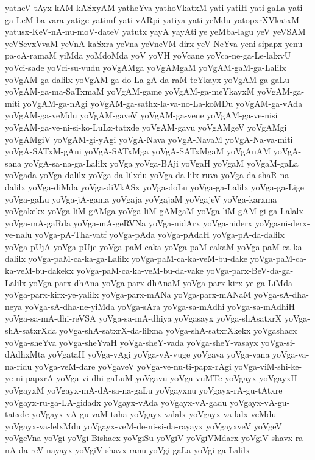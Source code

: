 {yatheV-tAyx-kAM-kASxyAM
yatheYva
yathoVkatxM
yati
yatiH
yati-gaLa
yati-ga-LeM-ba-vara
yatige
yatimf
yati-vARpi
yatiya
yati-yeMdu
yatopxrXVkatxM
yatusx-KeV-nA-nu-moV-dateV
yatutx
yayA
yayAti
ye
yeMba-lagu
yeV
yeVSAM
yeVSevxVvaM
yeVnA-kaSxra
yeVna
yeVneVM-dirx-yeV-NeYva
yeni-sipapx
yenu-pa-cA-ramaM
yiMda
yoMdoMda
yoV
yoVH
yoVcane
yoVca-ne-ga-Le-lalxvU
yoVci-sade
yoVci-su-vudu
yoVgAMga
yoVgAMgaM
yoVgAM-gaM-ga-Lalilx
yoVgAM-ga-dalilx
yoVgAM-ga-do-La-gA-da-raM-teYkayx
yoVgAM-ga-gaLu
yoVgAM-ga-ma-SaTxmaM
yoVgAM-game
yoVgAM-ga-meYkayxM
yoVgAM-ga-miti
yoVgAM-ga-nAgi
yoVgAM-ga-sathx-la-va-no-La-koMDu
yoVgAM-ga-vAda
yoVgAM-ga-veMdu
yoVgAM-gaveV
yoVgAM-ga-vene
yoVgAM-ga-ve-nisi
yoVgAM-ga-ve-ni-si-ko-LuLx-tatxde
yoVgAM-gavu
yoVgAMgeV
yoVgAMgi
yoVgAMgiV
yoVgAM-gi-yAgi
yoVgA-Nava
yoVgA-NavaM
yoVgA-Na-va-miti
yoVgA-SATxM-gAni
yoVgA-SATxMga
yoVgA-SATxMgaM
yoVgAnAM
yoVgA-sana
yoVgA-sa-na-ga-Lalilx
yoVga
yoVga-BAji
yoVgaH
yoVgaM
yoVgaM-gaLa
yoVgada
yoVga-dalilx
yoVga-da-lilxdu
yoVga-da-lilx-ruva
yoVga-da-shaR-na-dalilx
yoVga-diMda
yoVga-diVkASx
yoVga-doLu
yoVga-ga-Lalilx
yoVga-ga-Lige
yoVga-gaLu
yoVga-jA-gama
yoVgaja
yoVgajaM
yoVgajeV
yoVga-karxma
yoVgakekx
yoVga-liM-gAMga
yoVga-liM-gAMgaM
yoVga-liM-gAM-gi-ga-Lalalx
yoVga-mA-gaRda
yoVga-mA-geRVNa
yoVga-nidArx
yoVga-niderx
yoVga-ni-derx-ye-nalu
yoVga-pA-Tha-vatf
yoVga-pAda
yoVga-pAdaH
yoVga-pA-da-dalilx
yoVga-pUjA
yoVga-pUje
yoVga-paM-caka
yoVga-paM-cakaM
yoVga-paM-ca-ka-dalilx
yoVga-paM-ca-ka-ga-Lalilx
yoVga-paM-ca-ka-veM-bu-dake
yoVga-paM-ca-ka-veM-bu-dakekx
yoVga-paM-ca-ka-veM-bu-da-vake
yoVga-parx-BeV-da-ga-Lalilx
yoVga-parx-dhAna
yoVga-parx-dhAnaM
yoVga-parx-kirx-ye-ga-LiMda
yoVga-parx-kirx-ye-yalilx
yoVga-parx-mANa
yoVga-parx-mANaM
yoVga-sA-dha-neya
yoVga-sA-dha-ne-yiMda
yoVga-sAra
yoVga-sa-mAdhi
yoVga-sa-mAdhiH
yoVga-sa-mA-dhi-reVSA
yoVga-sa-mA-dhiya
yoVgasayx
yoVga-shAsatxrX
yoVga-shA-satxrXda
yoVga-shA-satxrX-da-lilxna
yoVga-shA-satxrXkekx
yoVgashacx
yoVga-sheYva
yoVga-sheYvaH
yoVga-sheY-vada
yoVga-sheY-vasayx
yoVga-si-dAdhxMta
yoVgataH
yoVga-vAgi
yoVga-vA-vuge
yoVgava
yoVga-vana
yoVga-va-na-ridu
yoVga-veM-dare
yoVgaveV
yoVga-ve-nu-ti-papx-rAgi
yoVga-viM-shi-ke-ye-ni-papxrA
yoVga-vi-dhi-gaLuM
yoVgavu
yoVga-vuMTe
yoVgayx
yoVgayxH
yoVgayxM
yoVgayx-mA-dA-sa-na-gaLu
yoVgayxnu
yoVgayx-rA-gu-tAtxre
yoVgayx-ru-ga-LA-gidadx
yoVgayx-vAda
yoVgayx-vA-gadu
yoVgayx-vA-gu-tatxde
yoVgayx-vA-gu-vaM-taha
yoVgayx-valalx
yoVgayx-va-lalx-veMdu
yoVgayx-va-lelxMdu
yoVgayx-veM-de-ni-si-da-rayayx
yoVgayxveV
yoVgeV
yoVgeVna
yoVgi
yoVgi-Bishacx
yoVgiSu
yoVgiV
yoVgiVMdarx
yoVgiV-shavx-ra-nA-da-reV-nayayx
yoVgiV-shavx-ranu
yoVgi-gaLa
yoVgi-ga-Lalilx
}
